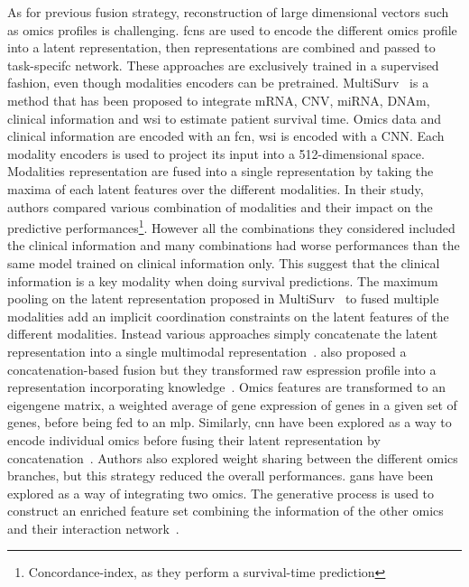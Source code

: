 \documentclass[../main.tex]{subfiles}
\begin{document}
			As for previous fusion strategy, reconstruction of large dimensional vectors such as omics profiles is challenging.
			\Glspl{fcn} are used to encode the different omics profile into a latent representation, then representations are combined and passed to task-specifc network. 
			These approaches are exclusively trained in a supervised fashion, even though modalities encoders can be pretrained. 
			MultiSurv~\cite{MultiSurv} is a method that has been proposed to integrate mRNA, CNV, miRNA, DNAm, clinical information and \gls{wsi} to estimate patient survival time.
			Omics data and clinical information are encoded with an \gls{fcn}, \gls{wsi} is encoded with a CNN. 
			Each modality encoders is used to project its input into a 512-dimensional space. 
			Modalities representation are fused into a single representation by taking the maxima of each latent features over the different modalities. 
			In their study, authors compared various combination of modalities and their impact on the predictive performances\footnote{Concordance-index, as they perform a survival-time prediction}. 
			However all the combinations they considered included the clinical information and many combinations had worse performances than the same model trained on clinical information only. 
			This suggest that the clinical information is a key modality when doing survival predictions. 
			The maximum pooling on the latent representation proposed in MultiSurv~\cite{MultiSurv} to fused multiple modalities add an implicit coordination constraints on the latent features of the different modalities. 
			Instead various approaches simply concatenate the latent representation into a single multimodal representation~\cite{MOLI,Lin2020}.
			\citeauthor{SALMON} also proposed a concatenation-based fusion but they transformed raw espression profile into a representation incorporating knowledge~\cite{SALMON}.
			Omics features are transformed to an eigengene matrix, a weighted average of gene expression of genes in a given set of genes, before being fed to an \gls{mlp}.
			Similarly, \gls{cnn} have been explored as a way to encode individual omics before fusing their latent representation by concatenation~\cite{MohaiminulIslam2020}. 
			Authors also explored weight sharing between the different omics branches, but this strategy reduced the overall performances.
			\Glspl{gan} have been explored as a way of integrating two omics.
			The generative process is used to construct an enriched feature set combining the information of the other omics and their interaction network~\cite{omicsGAN}.
\end{document}

